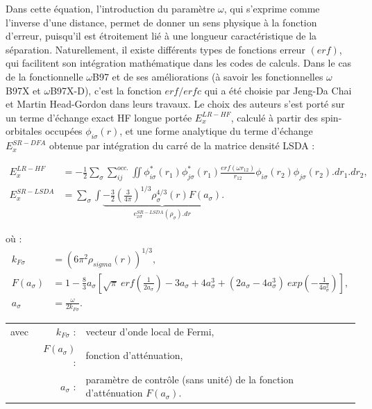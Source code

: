 	Dans cette équation, l'introduction du paramètre $\omega$, qui s'exprime comme l'inverse d'une distance, permet de donner un sens physique à la fonction d'erreur, puisqu'il est étroitement lié à une longueur caractéristique de la séparation.
	Naturellement, il existe différents types de fonctions erreur $(erf)$, qui facilitent son intégration mathématique dans les codes de calculs. Dans le cas de la fonctionnelle $\omega$B97 \cite{chai2008long} et de ses améliorations (à savoir les fonctionnelles $\omega$B97X et $\omega$B97X-D), c'est la fonction $erf/erfc$ qui a été choisie par Jeng-Da Chai et Martin Head-Gordon dans leurs travaux. 
	Le choix des auteurs s'est porté sur un terme d'échange exact HF longue portée $E_{x}^{LR-HF}$, calculé à partir des spin-orbitales occupées $\phi_{i \sigma}(r)$, et une forme analytique du terme d'échange $E_{x}^{SR-DFA}$ obtenue par intégration du carré de la matrice densité LSDA :
	
	\begin{align}
	E_{x}^{LR-HF} &= -\frac{1}{2} \sum_{\sigma} \sum_{ij}^{occ.} \iint \phi_{i \sigma}^{*}(r_{1}) \phi_{j \sigma}^{*}(r_{1}) \frac{erf(\omega r_{12})}{r_{12}} \phi_{i \sigma}(r_{2}) \phi_{j \sigma}(r_{2}).dr_{1}.dr_{2}, \\
	E_{x}^{SR-LSDA} &= \sum_{\sigma} \int \underbrace{-\frac{3}{2}\left(\frac{3}{4\pi}\right)^{1/3}\rho_{\sigma}^{4/3} (r) F(a_{\sigma})}_{e_{x \sigma}^{SR-LSDA} (\rho_{\sigma}) .dr}.
	\end{align}
	
	\noindent où :
	\begin{align}
	k_{F \sigma}&=(6\pi^{2}\rho_{sigma}(r))^{1/3},\nonumber\\
	F(a_{\sigma})&=1-\frac{8}{3}a_{\sigma}\left[\sqrt{\pi}\: erf\left(\frac{1}{2a_{\sigma}}\right)-3a_{\sigma}+4a_{\sigma}^{3}+(2a_{\sigma}-4a_{\sigma}^{3}) \: exp\left(-\frac{1}{4a_{\sigma}^{2}}\right)\right],\nonumber\\
	a_{\sigma}&=\frac{\omega}{2k_{F\sigma}}.\nonumber
	\end{align}
	
	\begin{flushleft}
		\begin{tabular}{@{}lrp{10cm}}
			avec & $k_{F\sigma}$ : & vecteur d'onde local de Fermi,\\
			& $F(a_{\sigma})$ : & fonction d'atténuation,\\
			& $a_{\sigma}$ : & paramètre de contrôle (sans unité) de la fonction d'atténuation $F(a_{\sigma})$.
		\end{tabular}
	\end{flushleft}
	
